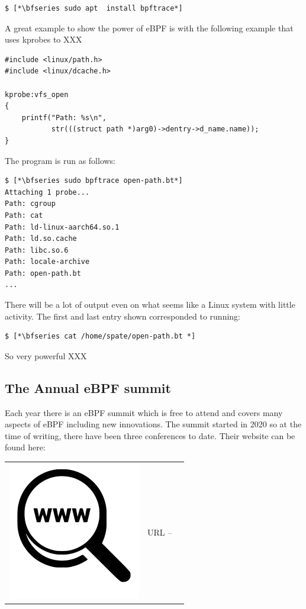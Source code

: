 \begin{lstlisting}
$ [*\bfseries sudo apt  install bpftrace*]
\end{lstlisting}

\noindent
A great example to show the power of eBPF is with the following example that uses kprobes to XXX


\begin{lstlisting}
#include <linux/path.h>
#include <linux/dcache.h>

kprobe:vfs_open
{
    printf("Path: %s\n", 
           str(((struct path *)arg0)->dentry->d_name.name));
}
\end{lstlisting}

\noindent
The program is run as follows:

\begin{lstlisting}
$ [*\bfseries sudo bpftrace open-path.bt*]
Attaching 1 probe...
Path: cgroup
Path: cat
Path: ld-linux-aarch64.so.1
Path: ld.so.cache
Path: libc.so.6
Path: locale-archive
Path: open-path.bt
...
\end{lstlisting}

\noindent
There will be a lot of output even on what seems like a Linux system with little activity. The first and last entry shown corresponded to running:

\begin{lstlisting}
$ [*\bfseries cat /home/spate/open-path.bt *]
\end{lstlisting}

\noindent
So very powerful XXX

\subsection{The Annual eBPF summit}

Each year there is an eBPF summit which is free to attend and covers many aspects of eBPF including new innovations. The summit started in 2020 so at the time of writing, there have been three conferences to date. Their website can be found here:

\begin{table}[h]
\begin{tabular}{lcl}
\parbox[r]{0.5in}{\includegraphics[scale=0.15]{figures/url.png}} & \parbox[l]{0.55in}{URL  -- } & \parbox[l]{3in}{}
\end{tabular}
\end{table}

